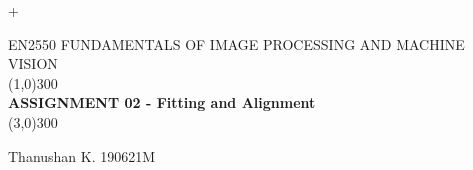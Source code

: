 \documentclass[10.5pt]{article}
\begin{document}
    
\begin{center}
    \vspace*{-2cm}+

    \textsc{\large EN2550 FUNDAMENTALS OF IMAGE PROCESSING AND MACHINE VISION}\\
    [3mm]
    \line(1,0){300}\\
    [1mm]
    \huge{\bfseries  ASSIGNMENT 02 - Fitting and Alignment} \\
    \line(3,0){300}\\
[0.3cm]  
\end{center}
\begin{center}
    Thanushan K.
    \hspace*{1cm}
    190621M
\end{center}
\vspace*{0.25cm}
\end{document}
